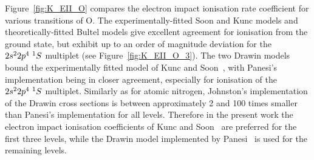 {\par

Figure~\ref{fig:K_EII_O} compares the electron impact ionisation rate coefficient for various transitions of O.
The experimentally-fitted Soon and Kunc models and theoretically-fitted Bultel models give excellent agreement for ionisation from the ground state, but exhibit up to an order of magnitude deviation for the $2s^2 2p^4 \text{ } ^1S$ multiplet (see Figure~\ref{fig:K_EII_O_3}).
The two Drawin models bound the experimentally fitted model of Kunc and Soon~\cite{KS1989}, with Panesi's implementation being in closer agreement, especially for ionisation of the $2s^2 2p^4 \text{ } ^1S$ multiplet.
Similarly as for atomic nitrogen, Johnston's implementation of the Drawin cross sections is between approximately 2 and 100 times smaller than Panesi's implementation for all levels.
Therefore in the present work the electron impact ionisation coefficients of Kunc and Soon~\cite{KS1989} are preferred for the first three levels, while the Drawin model implemented by Panesi~\cite{JohnPhd} is used for the remaining levels.

}
